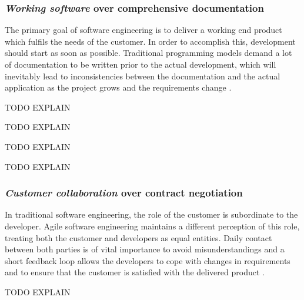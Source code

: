 \subsubsection{\emph{Working software} over comprehensive documentation}
The primary goal of software engineering is to deliver a working end product which fulfils the needs of the customer. In order to accomplish this, development should start as soon as possible. Traditional programming models demand a lot of documentation to be written prior to the actual development, which will inevitably lead to inconsistencies between the documentation and the actual application as the project grows and the requirements change \cite{Hazzan2014}. 
	
TODO EXPLAIN

TODO EXPLAIN

TODO EXPLAIN

TODO EXPLAIN

\subsubsection{\emph{Customer collaboration} over contract negotiation}
In traditional software engineering, the role of the customer is subordinate to the developer. Agile software engineering maintains a different perception of this role, treating both the customer and developers as equal entities. Daily contact between both parties is of vital importance to avoid misunderstandings and a short feedback loop allows the developers to cope with changes in requirements and to ensure that the customer is satisfied with the delivered product \cite{Hazzan2014}.

TODO EXPLAIN

